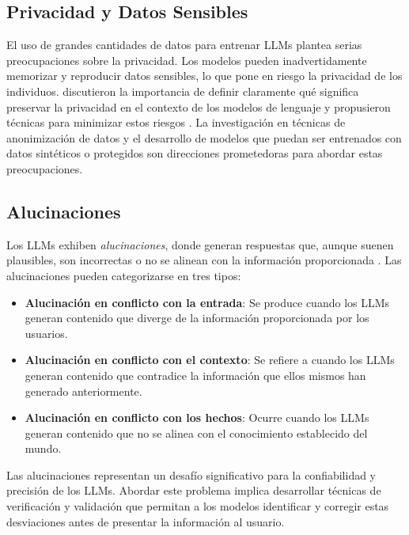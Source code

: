 \subsection{Privacidad y Datos Sensibles}
El uso de grandes cantidades de datos para entrenar LLMs plantea serias preocupaciones sobre la privacidad. Los modelos pueden inadvertidamente memorizar y reproducir datos sensibles, lo que pone en riesgo la privacidad de los individuos. \citep{brown2022does} discutieron la importancia de definir claramente qué significa preservar la privacidad en el contexto de los modelos de lenguaje y propusieron técnicas para minimizar estos riesgos . La investigación en técnicas de anonimización de datos y el desarrollo de modelos que puedan ser entrenados con datos sintéticos o protegidos son direcciones prometedoras para abordar estas preocupaciones.

\subsection{Alucinaciones}
Los LLMs exhiben \textit{alucinaciones}, donde generan respuestas que, aunque suenen plausibles, son incorrectas o no se alinean con la información proporcionada \citep{zhang2023siren}. Las alucinaciones pueden categorizarse en tres tipos:

\begin{itemize}
    \item \textbf{Alucinación en conflicto con la entrada}: Se produce cuando los LLMs generan contenido que diverge de la información proporcionada por los usuarios.
    \item \textbf{Alucinación en conflicto con el contexto}: Se refiere a cuando los LLMs generan contenido que contradice la información que ellos mismos han generado anteriormente.
    \item \textbf{Alucinación en conflicto con los hechos}: Ocurre cuando los LLMs generan contenido que no se alinea con el conocimiento establecido del mundo.
\end{itemize}

Las alucinaciones representan un desafío significativo para la confiabilidad y precisión de los LLMs. Abordar este problema implica desarrollar técnicas de verificación y validación que permitan a los modelos identificar y corregir estas desviaciones antes de presentar la información al usuario.


